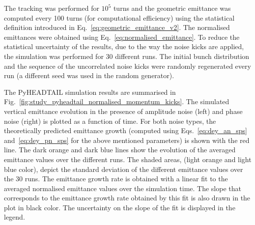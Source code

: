 The tracking was performed for $10^5$ turns and the geometric emittance was computed every 100 turns (for computational efficiency) using the statistical definition introduced in Eq.~\eqref{eq:geometric_emittance_v2}. The normalised emittances were obtained using Eq.~\eqref{eq:normalised_emittance}. To reduce the statistical uncertainty of the results, due to the way the noise kicks are applied, the simulation was performed for 30 different runs. The initial bunch distribution and the sequence of the uncorrelated noise kicks were randomly regenerated every run (a different seed was used in the random generator).

The PyHEADTAIL simulation results are summarised in Fig.~\ref{fig:study_pyheadtail_normalised_momentum_kicks}. The simulated vertical emittance evolution in the presence of amplitude noise (left) and phase noise (right) is plotted as a function of time. For both noise types, the theoretically predicted emittance growth (computed using Eqs.~\eqref{eq:dey_an_sps} and~\eqref{eq:dey_pn_sps} for the above mentioned parameters) is shown with the red line. The dark orange and dark blue lines show the evolution of the averaged emittance values over the different runs. The shaded areas, (light orange and light blue color), depict the standard deviation of the different emittance values over the 30 runs. The emittance growth rate is obtained with a linear fit to the averaged normalised emittance values over the simulation time. The slope that corresponds to the emittance growth rate obtained by this fit is also drawn in the plot in black color. The uncertainty on the slope of the fit is displayed in the legend.

